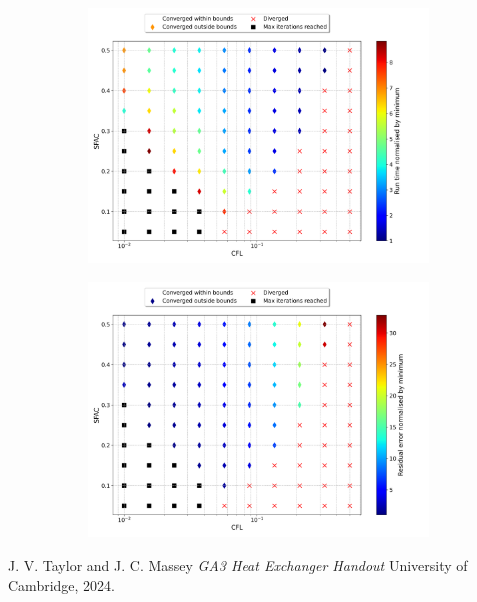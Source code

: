 \documentclass{article}
\begin{document}
\begin{figure}[H]
    \centering
    \begin{subfigure}{0.49\textwidth}
        \centering
        \includegraphics[width=0.99\textwidth]{figures/bump_cfl_sfac_time.png}
        \caption{}
        \label{fig:bump_time}
    \end{subfigure}
    \begin{subfigure}{0.49\textwidth}
        \centering
        \includegraphics[width=0.99\textwidth]{figures/bump_cfl_sfac_residual.png}
        \caption{}
        \label{fig:bump_residual}
    \end{subfigure}
\end{figure}

\begin{thebibliography}{9}

  J. V. Taylor and J. C. Massey
  \emph{GA3 Heat Exchanger Handout}
  University of Cambridge,
  2024.

\end{thebibliography}
\end{document}
